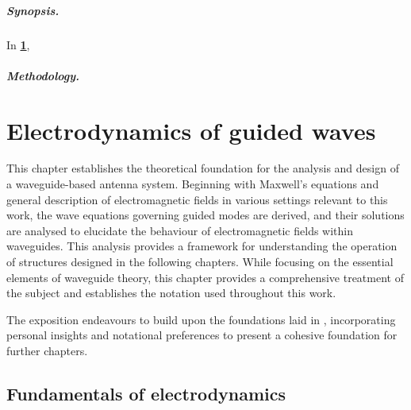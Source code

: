 \documentclass[11pt,a4paper,twoside,openany]{report}
\begin{document}
\paragraph*{Synopsis.} In \textbf{\cref{chap:electrodynamics}}, \lipsum[4]

\paragraph*{Methodology.} \lipsum[4]


\chapter{Electrodynamics of guided waves}
\label{chap:electrodynamics}
This chapter establishes the theoretical foundation for the analysis and design of a waveguide-based antenna system. Beginning with Maxwell's equations and general description of electromagnetic fields in various settings relevant to this work, the wave equations governing guided modes are derived, and their solutions are analysed to elucidate the behaviour of electromagnetic fields within waveguides. This analysis provides a framework for understanding the operation of structures designed in the following chapters. While focusing on the essential elements of waveguide theory, this chapter provides a comprehensive treatment of the subject and establishes the notation used throughout this work.

The exposition endeavours to build upon the foundations laid in \parencite{balanis:advanced-engineering-electromagnetics,griffiths:introduction-to-electrodynamics}, incorporating personal insights and notational preferences to present a cohesive foundation for further chapters.

\section{Fundamentals of electrodynamics}
\label{sec:fundamentals-of-electrodynamics}
\end{document}
